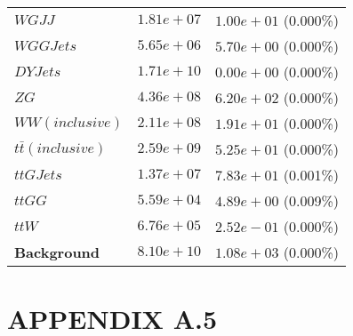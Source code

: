 \begin{table}[h!]
\begin{tabular}{ |l|c|c| }
                                    $WGJJ$ &  $1.81e+07$  &  $1.00e+01$ (0.000\%) \\
                                 $WGGJets$ &  $5.65e+06$  &  $5.70e+00$ (0.000\%) \\
                                  $DYJets$ &  $1.71e+10$  &  $0.00e+00$ (0.000\%) \\
                                      $ZG$ &  $4.36e+08$  &  $6.20e+02$ (0.000\%) \\
                           $WW(inclusive)$ &  $2.11e+08$  &  $1.91e+01$ (0.000\%) \\
                    $t\bar{t} (inclusive)$ &  $2.59e+09$  &  $5.25e+01$ (0.000\%) \\
                                 $ttGJets$ &  $1.37e+07$  &  $7.83e+01$ (0.001\%) \\
                                    $ttGG$ &  $5.59e+04$  &  $4.89e+00$ (0.009\%) \\
                                     $ttW$ &  $6.76e+05$  &  $2.52e-01$ (0.000\%) \\
                       \textbf{Background} &  $8.10e+10$  &  $1.08e+03$ (0.000\%) \\
    \hline
\end{tabular}
\label{fullyleptonic-cutflow}
\end{table}
\newpage


\section*{APPENDIX A.5}

